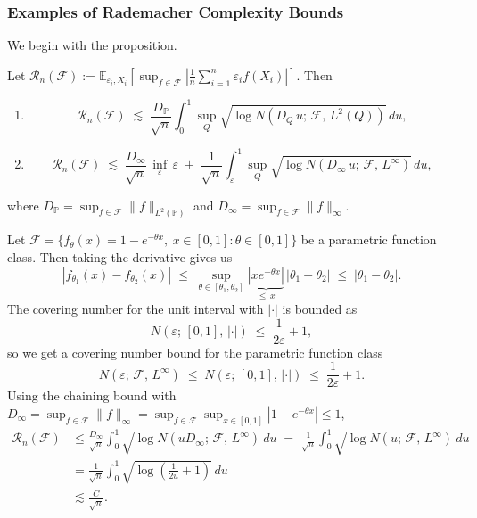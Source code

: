 \subsubsection{Examples of Rademacher Complexity Bounds}
We begin with the proposition.
\begin{prop}
Let $\mathcal{R}_n(\mathcal{F}) := \mathbb{E}_{\varepsilon_i, X_i}\!\left[\sup_{f\in\mathcal{F}}\left|\tfrac{1}{n}\sum_{i=1}^{n}\varepsilon_i f(X_i)\right|\right]$. Then
\begin{enumerate}
    \item 
    \[
    \mathcal{R}_n(\mathcal{F})
    \;\lesssim\; \frac{D_{\mathbb{P}}}{\sqrt{n}}\int_{0}^{1} \sup_{Q} \sqrt{\log N\!\left(D_{Q}\,u;\,\mathcal{F},\,L^2(Q)\right)}\,du,
    \]
    
    \item 
    \[
    \mathcal{R}_n(\mathcal{F})
    \;\lesssim\; \frac{D_{\infty}}{\sqrt{n}}\,\inf_{\varepsilon}\,\varepsilon
    \;+\; \frac{1}{\sqrt{n}}\int_{\varepsilon}^{1} \sup_{Q} \sqrt{\log N\!\left(D_{\infty}\,u;\,\mathcal{F},\,L^\infty\right)}\,du,
    \]
\end{enumerate}
where $D_{\mathbb{P}} = \sup_{f\in\mathcal{F}}\|f\|_{L^2(\mathbb{P})}$ and $D_{\infty} = \sup_{f\in\mathcal{F}}\|f\|_{\infty}$.
\end{prop}

\begin{exam}
Let $\mathcal{F} = \{f_\theta(x) = 1 - e^{-\theta x},\ x \in [0,1] : \theta \in [0,1]\}$ be a parametric function class. Then taking the derivative gives us
\[
|f_{\theta_1}(x) - f_{\theta_2}(x)|
\;\leq\; \sup_{\theta \in [\theta_1, \theta_2]} \underbrace{|x e^{-\theta x}|}_{\leq\, x}\,|\theta_1 - \theta_2|
\;\leq\; |\theta_1 - \theta_2|.
\]
The covering number for the unit interval with $|\cdot|$ is bounded as
\[
N(\varepsilon;\,[0,1],\,|\cdot|) \;\leq\; \frac{1}{2\varepsilon} + 1,
\]
so we get a covering number bound for the parametric function class
\[
N(\varepsilon;\,\mathcal{F},\,L^\infty)
\;\leq\; N(\varepsilon;\,[0,1],\,|\cdot|)
\;\leq\; \frac{1}{2\varepsilon} + 1.
\]
Using the chaining bound with $D_\infty = \sup_{f\in\mathcal{F}}\|f\|_\infty = \sup_{f\in\mathcal{F}}\sup_{x\in[0,1]}|1 - e^{-\theta x}| \leq 1$,
\begin{align*}
\mathcal{R}_n(\mathcal{F})
&\leq \frac{D_\infty}{\sqrt{n}} \int_{0}^{1} \sqrt{\log N\!\left(u D_\infty;\,\mathcal{F},\,L^\infty\right)}\, du
\;=\; \frac{1}{\sqrt{n}} \int_{0}^{1} \sqrt{\log N\!\left(u;\,\mathcal{F},\,L^\infty\right)}\, du \\
&= \frac{1}{\sqrt{n}} \int_{0}^{1} \sqrt{\log\!\left(\tfrac{1}{2u} + 1\right)}\, du \\
&\lesssim \frac{C}{\sqrt{n}}.
\end{align*}
\end{exam}

